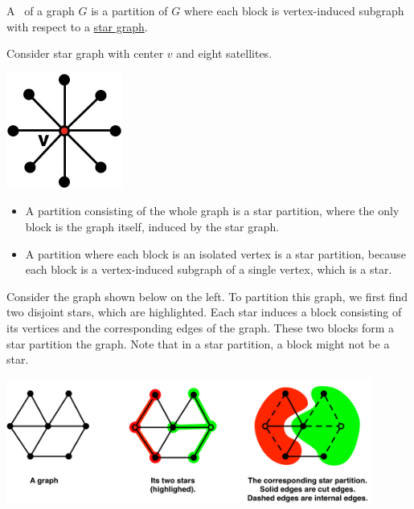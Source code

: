 \begin{flex}
\begin{definition}
\label{def::graphcon::star-partition}
A~ of a graph $G$ is a partition of $G$ where each block
is vertex-induced subgraph with respect to a 
%
\href{def:graphcon::edge::analysis::star::star-graph}{star graph}.
\end{definition}

\begin{example}
\label{ex:graphcon::star::partition::1}
Consider star graph with center $v$ and eight satellites.
  \begin{center}
  \includegraphics[width=1.5in]{./graph-contraction/media-star/star-graph1.jpg}
  \end{center}

\begin{itemize}
\item A partition consisting of the whole graph is a star partition, where 
the only block is the graph itself, induced by the star graph.

\item A partition where each block is an isolated vertex is a star
  partition, because each block is a vertex-induced subgraph of a
  single vertex, which is a star.
\end{itemize}

\end{example}


\begin{example}
\label{ex:graphcon::star::partition::2}


Consider the graph shown below on the left.
%
To partition this graph, we first find two disjoint stars, which are
highlighted.
%
Each star induces a block consisting of its vertices and the
corresponding edges of the graph.
%
These two blocks form a star partition the graph.
%
Note that in a star partition, a block might not be a star.
\begin{center}
\includegraphics[width=0.9\textwidth]{./graph-contraction/media-star/star-decomposition-1.jpg}
\end{center}
\end{example}
\end{flex}

